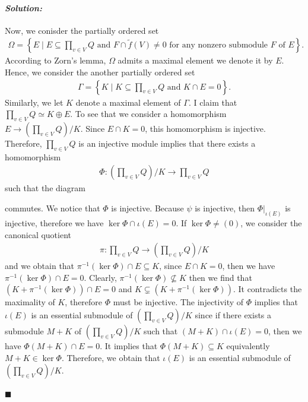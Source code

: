 \documentclass[12pt, a4paper]{article}
\theoremstyle{remark}
\newenvironment{solution}
  {\paragraph{\textit{Solution:}}\par\medskip}
  {\hfill$\blacksquare$\vspace{0.1cm}}
\begin{document}
\begin{solution}
    Now, we conisder the partially ordered set
    \begin{align*}
        \Omega = \left\{E\mid E\subseteq \prod_{v\in V} Q \text{ and }F\cap \tilde{f}(V)\neq 0\text{ for any nonzero submodule $F$ of $E$} \right\}.
    \end{align*}
    According to Zorn's lemma, $\Omega$ admits a maximal element we denote it by $E$. Hence, we consider the another partially ordered set 
    \begin{align*}
        \Gamma = \left\{K\mid K\subseteq \prod_{v\in V} Q \text{ and }K\cap E = 0 \right\}.
    \end{align*}
    Similarly, we let $K$ denote a maximal element of $\Gamma$. I claim that $\prod_{v\in V} Q\simeq K\oplus E$.
    To see that we consider a homomorphism $E \to (\prod_{v\in V} Q)/K$. Since $E\cap K =0$, this homomorphism is injective. Therefore, $\prod_{v\in V} Q$ is an injective module implies that 
    there exists a homomorphism 
    \begin{align*}
        \Phi:\left(\prod_{v\in V} Q\right)/K \to \prod_{v\in V} Q
    \end{align*}
    such that the diagram
    \begin{center}
    \end{center}
    commutes. We notice that $\Phi$ is injective. 
    Because $\psi$ is injective, then $\Phi|_{\iota(E)}$ is injective, therefore we have $\ker \Phi\cap \iota(E) = 0$.
    If $\ker \Phi\neq (0)$,  we consider the canonical quotient 
    \begin{align*}
        \pi:\prod_{v\in V} Q \to \left(\prod_{v\in V} Q\right)/K
    \end{align*}
    and we obtain that $\pi^{-1}(\ker \Phi)\cap E\subseteq K$, since $E\cap K=0$, then we have $\pi^{-1}(\ker \Phi)\cap E=0$.
    Clearly, $\pi^{-1}(\ker \Phi)\not\subseteq K$ then we find that $(K+\pi^{-1}(\ker\Phi))\cap E=0$ and $K\subsetneq(K+\pi^{-1}(\ker\Phi))$.
    It contradicts the maximality of $K$, therefore $\Phi$ must be injective.
    The injectivity of $\Phi$ implies that $\iota(E)$ is an essential submodule of $(\prod_{v\in V} Q)/K$ since if there exists a submodule $M+K$ of $\left(\prod_{v\in V} Q\right)/K$ such that $(M+K)\cap \iota(E)=0$,
    then we have $\Phi(M+K)\cap E = 0$. It implies that $\Phi(M+K)\subseteq K$ equivalently $M+K\in\ker \Phi$.
    Therefore, we obtain that $\iota(E)$ is an essential submodule of $(\prod_{v\in V} Q)/K$.


\end{solution}
\end{document}
